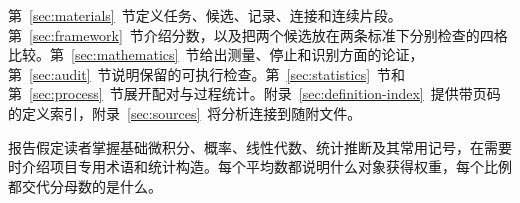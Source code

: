 第~\ref{sec:materials}~节定义任务、候选、记录、连接和连续片段。第~\ref{sec:framework}~节介绍分数，以及把两个候选放在两条标准下分别检查的四格比较。第~\ref{sec:mathematics}~节给出测量、停止和识别方面的论证，第~\ref{sec:audit}~节说明保留的可执行检查。第~\ref{sec:statistics}~节和第~\ref{sec:process}~节展开配对与过程统计。附录~\ref{sec:definition-index}~提供带页码的定义索引，附录~\ref{sec:sources}~将分析连接到随附文件。

报告假定读者掌握基础微积分、概率、线性代数、统计推断及其常用记号，在需要时介绍项目专用术语和统计构造。每个平均数都说明什么对象获得权重，每个比例都交代分母数的是什么。

